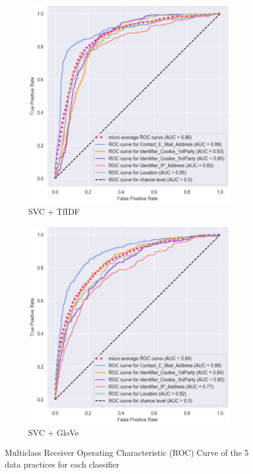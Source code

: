 \begin{figure}[!ht]
	\medskip
  
	\begin{subfigure}[t]{.5\textwidth}
	  \centering
	  \includegraphics[width=\linewidth]{figures/roc_svc_tfidf.png}
	  \caption{SVC + TfIDF}
	\end{subfigure}
	\hfill
	\begin{subfigure}[t]{.5\textwidth}
	  \centering
	  \includegraphics[width=\linewidth]{figures/roc_svc_glove.png}
	  \caption{SVC + GloVe}
	\end{subfigure}
	\caption{Multiclass Receiver Operating Characteristic (ROC) Curve of the 5 data practices for each classifier}
	\label{fig:roc_curve}
  \end{figure}


